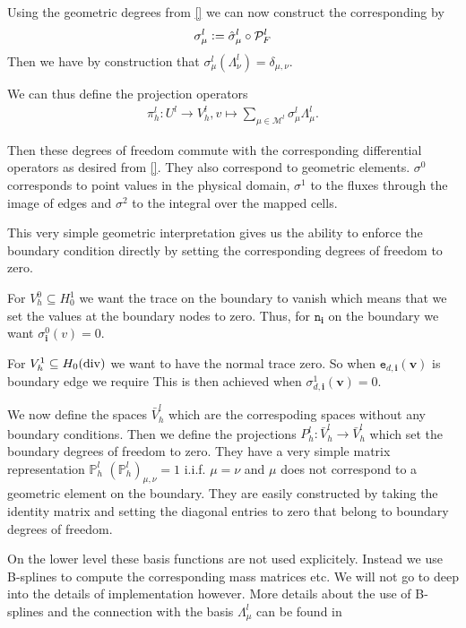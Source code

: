 \documentclass[../master_thesis.tex]{subfiles}
\begin{document}
Using the geometric degrees from \ref{} we can now construct the corresponding 
by 
\begin{align*}
    \sigma^l_\mu \vcentcolon= \hat{\sigma}_\mu^l \circ \mathcal{P}_F^l
\end{align*}
Then we have by construction that 
$\sigma^l_\mu(\Lambda^l_{\nu}) = \delta_{\mu,\nu}$. 

We can thus define the projection operators 
\begin{align*}
    \pi_h^l: U^l \rightarrow V_h^l, v \mapsto \sum_{\mu \in \mathcal{M}^l} \sigma^l_\mu \Lambda^l_\mu.
\end{align*}

Then these degrees of freedom commute with the corresponding differential operators 
as desired from \ref{}. They also correspond to geometric elements. 
$\sigma^0$ corresponds to point values in the physical domain, 
$\sigma^1$ to the fluxes through the image of edges and 
$\sigma^2$ to the integral over the mapped cells.

This very simple geometric interpretation gives us the ability to enforce 
the boundary condition directly by setting the corresponding degrees of freedom 
to zero. 

For $V_h^0 \subseteq H^1_0$ we want the trace on the boundary to vanish which 
means that we set the values at the boundary nodes to zero. Thus, 
for $\mathtt{n}_\mathbf{i}$ on the boundary we want 
$\sigma^0_{\mathbf{i}}(v) = 0$. 

For $V_h^1 \subseteq H_0(\operatorname{div})$ we want to have the normal trace zero. 
So when $\mathtt{e}_{d,\mathbf{i}}(\mathbf{v})$ is boundary edge we require
This is then achieved when $\sigma^1_{d,\mathbf{i}} (\mathbf{v}) = 0$.

We now define the spaces $\bar{V}_h^l$ which are the correspoding spaces 
without any boundary conditions. Then we define the 
projections $P_h^l: \bar{V}_h^l \rightarrow \bar{V}_h^l$ which set 
the boundary degrees of freedom to zero. They have a very simple 
matrix representation $\mathbb{P}_h^l$ 
$(\mathbb{P}_h^l)_{\mu, \nu} = 1 $ i.i.f. $\mu = \nu$ and $\mu$ does not 
correspond to a geometric element on the boundary. They are easily constructed 
by taking the identity matrix and setting the diagonal entries to zero that 
belong to boundary degrees of freedom.

On the lower level these basis functions are not used explicitely. Instead 
we use B-splines to compute the corresponding mass matrices etc. We will not 
go to deep into the details of implementation however. More details about the 
use of B-splines and the connection with the basis $\Lambda^l_\mu$ can be found 
in \cite[Sec.\,4.8]{multipatch_paper} 

\
\end{document}
